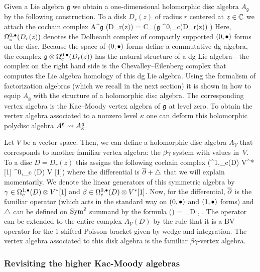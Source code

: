 \documentclass[11pt]{amsart}
\def\lie#1{\ensuremath{\mathfrak{#1}}}
\begin{document}
Given a Lie algebra $\lie{g}$ we obtain a one-dimensional holomorphic disc algebra $A_{\lie{g}}$ by the following construction. 
To a disk $D_r(z)$ of radius $r$ centered at $z \in \mathbb C$ we attach the cochain complex
\beqn
\label{eqn:diskskm}
A^{\lie{g}} (D_r(z)) = C_\bu \left(\lie{g} \otimes \Omega^{0,\bu}_c(D_r(z)) \right) 
\eeqn
Here, $\Omega^{0,\bullet}_c(D_r(z))$ denotes the Dolbeault complex of compactly supported $(0,\bullet)$ forms on the disc.
Because the space of $(0,\bullet)$ forms define a commutative dg algebra, 
the complex $\lie{g} \otimes \Omega^{0,\bu}_c(D_r(z))$ has the natural structure of a dg Lie algebra---the complex on the right hand side is the Chevalley--Eilenberg complex that computes the Lie algebra homology of this dg Lie algebra.
Using the formalism of factorization algebras (which we recall in the next section) it is shown in \cite{CG2} how to equip $A_{\lie{g}}$ with the structure of a holomorphic disc algebra.
The corresponding vertex algebra is the Kac--Moody vertex algebra of $\mathfrak g$ at level zero. 
To obtain the vertex algebra associated to a nonzero level $\kappa$ one can deform this holomorphic polydisc algebra $A^{\mathfrak g} \rightsquigarrow A^\mathfrak g_{\kappa}$.

Let $V$ be a vector space.
Then, we can define a holomorphic disc algebra $A_V$ that corresponds to another familiar vertex algebra: the $\beta\gamma$ system with values in~$V$.
To a disc $D = D_r(z)$ this assigns the following cochain complex
\beqn
\Sym \left(\Omega^{1,\bu}_c(D) \otimes V^* [1] \oplus \Omega^{0,\bu}_c (D) \otimes V [1]\right) 
\eeqn
where the differential is ${\overline{\partial}} + \triangle$ that we will explain momentarily. 
We denote the linear generators of this symmetric algebra by $\gamma \in \Omega^{1,\bullet}_c(D) \otimes V^* [1]$ and $\beta \in \Omega^{0,\bullet}_c(D) \otimes V^* [1]$.
Now, for the differential, ${\overline{\partial}}$ is the familiar operator (which acts in the standard way on $(0,\bullet)$ and $(1,\bullet)$ forms) and $\triangle$ can be defined on $\operatorname{Sym}^2$ summand by the formula
\beqn
\triangle (\gamma \cdot \beta) = \int_D \<\gamma, \beta\> . 
\eeqn
The operator can be extended to the entire complex $A_V(D)$ by the rule that it is a BV operator for the $1$-shifted Poisson bracket given by wedge and integration.
The vertex algebra associated to this disk algebra is the familiar $\beta\gamma$-vertex algebra.

\subsubsection{Revisiting the higher Kac-Moody algebras}
\end{document}

